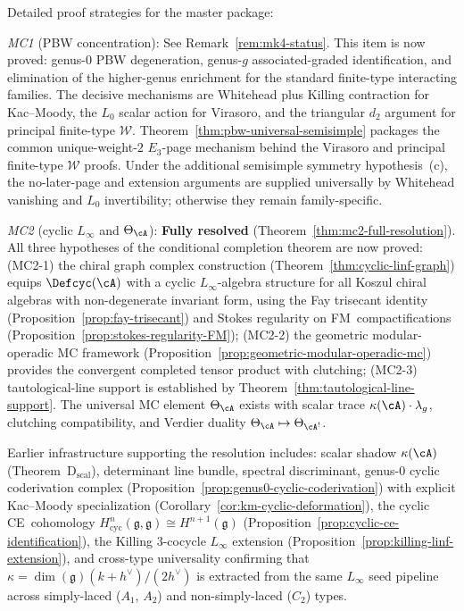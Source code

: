 \begin{remark}\label{rem:proof-roadmaps}
Detailed proof strategies for the master package:

\emph{MC1} (PBW concentration):
See Remark~\ref{rem:mk4-status}.  This item is now proved:
genus-$0$ PBW degeneration, genus-$g$ associated-graded
identification, and elimination of the higher-genus enrichment for the
standard finite-type interacting families.  The decisive mechanisms are
Whitehead plus Killing contraction for Kac--Moody, the $L_0$ scalar
action for Virasoro, and the triangular $d_2$ argument for principal
finite-type $\mathcal{W}$.
Theorem~\ref{thm:pbw-universal-semisimple} packages the common
unique-weight-$2$ $E_3$-page mechanism behind the Virasoro and
principal finite-type $\mathcal{W}$ proofs.  Under the additional
semisimple symmetry hypothesis~(c), the no-later-page and extension
arguments are supplied universally by Whitehead vanishing and $L_0$
invertibility; otherwise they remain family-specific.

\emph{MC2} (cyclic $L_\infty$ and $\Theta_{\cA}$):
\textbf{Fully resolved}
(Theorem~\ref{thm:mc2-full-resolution}).
All three hypotheses of the conditional completion
theorem are now proved:
\textup{(MC2-1)} the chiral graph complex construction
(Theorem~\ref{thm:cyclic-linf-graph}) equips
$\Defcyc(\cA)$ with a cyclic $L_\infty$-algebra structure
for all Koszul chiral algebras with non-degenerate invariant
form, using the Fay trisecant identity
(Proposition~\ref{prop:fay-trisecant}) and Stokes regularity
on FM~compactifications
(Proposition~\ref{prop:stokes-regularity-FM});
\textup{(MC2-2)} the geometric modular-operadic MC framework
(Proposition~\ref{prop:geometric-modular-operadic-mc}) provides
the convergent completed tensor product with clutching;
\textup{(MC2-3)} tautological-line support is established by
Theorem~\ref{thm:tautological-line-support}.
The universal MC element $\Theta_{\cA}$ exists with scalar trace
$\kappa(\cA)\cdot\lambda_g$, clutching compatibility, and Verdier
duality $\Theta_{\cA}\mapsto\Theta_{\cA^!}$.

Earlier infrastructure supporting the resolution includes: scalar shadow
$\kappa(\cA)$ (Theorem~D$_{\mathrm{scal}}$), determinant line bundle,
spectral discriminant, genus-$0$ cyclic coderivation complex
(Proposition~\ref{prop:genus0-cyclic-coderivation}) with explicit
Kac--Moody specialization
(Corollary~\ref{cor:km-cyclic-deformation}),
the cyclic CE~cohomology
$H^n_{\mathrm{cyc}}(\mathfrak{g},\mathfrak{g})\cong H^{n+1}(\mathfrak{g})$
(Proposition~\ref{prop:cyclic-ce-identification}),
the Killing $3$-cocycle $L_\infty$ extension
(Proposition~\ref{prop:killing-linf-extension}),
and cross-type universality confirming that
$\kappa = \dim(\mathfrak{g})(k+h^\vee)/(2h^\vee)$
is extracted from the same $L_\infty$ seed pipeline across
simply-laced ($A_1$, $A_2$) and non-simply-laced ($C_2$) types.


\end{remark}
